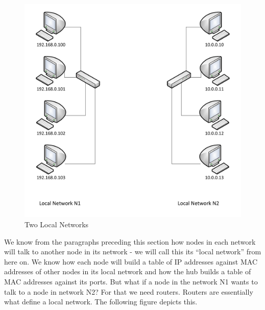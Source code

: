 	\begin{figure}[h]
	\centering
	\includegraphics[width = \textwidth]{partNW/TwoLocalNetworks}
	\caption{Two Local Networks}
	\label{fig:localNWs}
	\end{figure}

We know from the paragraphs preceding this section how nodes in each network will talk to another node in its network - we will call this its ``local network'' from here on. We know how each node will build a table of IP addresses against MAC addresses of other nodes in its local network and how the hub builds a table of MAC addresses against its ports. But what if a node in the network N1 wants to talk to a node in network N2? For that we need routers. Routers are essentially what define a local network. The following figure depicts this. 

